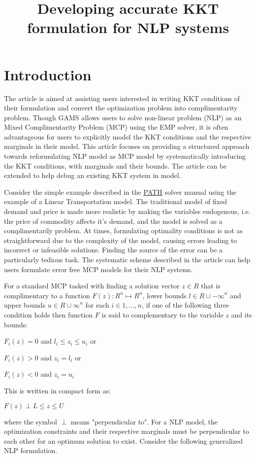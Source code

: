 \documentclass{article}
\title{Developing accurate KKT formulation for NLP systems}
\begin{document}
\section{Introduction}

The article is aimed at assisting users interested in writing KKT conditions of their formulation and convert the optimization problem into
complimentarity problem. Though GAMS allows users to solve non-linear problem (NLP) as an Mixed Complimentarity Problem (MCP) using the
EMP solver, it is often advantageous for users to explicitly model the KKT conditions and the respective marginals in their model.
This article focuses on providing a structured approach towards reformulating NLP model as MCP model by systematically introducing the KKT
conditions, with marginals and their bounds. The article can be extended to help debug an existing KKT system in model.


Consider the simple example described in the \href{https://www.gams.com/latest/docs/S_PATH.html}{PATH} solver manual using the example of a Linear Transportation model.
The traditional model of fixed demand and price is made more realistic by making the variables endogenous, i.e. the price of commodity affects it's demand, and the model
is solved as a complimentarily problem.  At times, formulating optimality conditions is not as straightforward due to the complexity of the model, causing errors
leading to incorrect or infeasible solutions. Finding the source of the error can be a particularly tedious task. The systematic scheme described in the article can
help users formulate error free MCP models for their NLP systems.

For a standard MCP tasked with finding a solution vector  $z \in \!R$ that is complimentary to a function $F(z) : {\!R}^n \mapsto {\!R}^n$,
lower bounds $ l \in { \!R \cup {-\infty}}^n$ and upper bounds $ u \in { \!R \cup {\infty}}^n$ for each $ i \in {1,...,n}$, if one of the following three
condition holds then function $F$ is said to complementary to the variable $z$ and its bounds:

 \centerline{$F_{i}(z) = 0$  and  $ l_i \leq z_i \leq u_i $   or}
 \centerline{$F_{i}(z) > 0$  and  $ z_i = l_i$  or }
 \centerline{ $F_{i}(z) < 0$  and  $ z_i = u_i$ }

\noindent This is written in compact form as:

\centerline{ $ F(z) \perp L \leq z \leq U $ }
\par
\noindent where the symbol $\perp$ means "perpendicular to". For a NLP model, the optimization constraints and their respective marginals must be
perpendicular to each other for an optimum solution to exist. Consider the following generalized NLP formulation.
\end{document}

